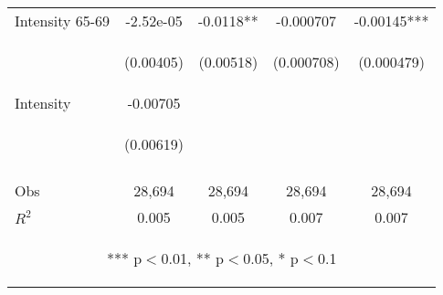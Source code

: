 \begin{subtables}
\begin{table}[htpb!]
\begin{center}
\begin{tabular}{p{5cm}cccc}
Intensity 65-69	&	-2.52e-05	&	-0.0118**	&	-0.000707	&	-0.00145***	 \\
	& \begin{footnotesize}	(0.00405)	\end{footnotesize} & \begin{footnotesize}	(0.00518)	\end{footnotesize} & \begin{footnotesize}	(0.000708)	\end{footnotesize} & \begin{footnotesize}	(0.000479)	\end{footnotesize} \\
Intensity  	&	-0.00705	&		&		&		 \\
	& \begin{footnotesize}	(0.00619)	\end{footnotesize} & \begin{footnotesize}		\end{footnotesize} & \begin{footnotesize}		\end{footnotesize} & \begin{footnotesize}		\end{footnotesize} \\
\vspace{4pt}	&	\begin{footnotesize}\end{footnotesize}	&	\begin{footnotesize}\end{footnotesize}	&	\begin{footnotesize}\end{footnotesize}	&	\begin{footnotesize}\end{footnotesize}	 \\
Obs	&	28,694	&	28,694	&	28,694	&	28,694	\\  
$R^2$	&	0.005	&	0.005	&	0.007	&	0.007	\\ \midrule
\multicolumn{5}{c}{\begin{footnotesize} *** p$<$0.01, ** p$<$0.05, * p$<$0.1\end{footnotesize}} \\									

\end{tabular}
\end{center}
\end{table}
\end{subtables}

